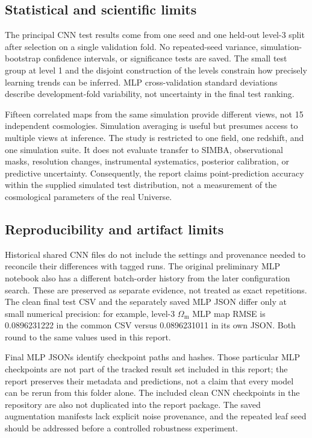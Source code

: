 \documentclass[11pt,a4paper]{article}
\newcommand{\Om}{\Omega_{\mathrm m}}
\begin{document}
\subsection{Statistical and scientific limits}
The principal CNN test results come from one seed and one held-out level-3 split after selection on a single validation fold. No repeated-seed variance, simulation-bootstrap confidence intervals, or significance tests are saved. The small test group at level 1 and the disjoint construction of the levels constrain how precisely learning trends can be inferred. MLP cross-validation standard deviations describe development-fold variability, not uncertainty in the final test ranking.

Fifteen correlated maps from the same simulation provide different views, not 15 independent cosmologies. Simulation averaging is useful but presumes access to multiple views at inference. The study is restricted to one field, one redshift, and one simulation suite. It does not evaluate transfer to SIMBA, observational masks, resolution changes, instrumental systematics, posterior calibration, or predictive uncertainty. Consequently, the report claims point-prediction accuracy within the supplied simulated test distribution, not a measurement of the cosmological parameters of the real Universe.

\subsection{Reproducibility and artifact limits}
Historical shared CNN files do not include the settings and provenance needed to reconcile their differences with tagged runs. The original preliminary MLP notebook also has a different batch-order history from the later configuration search. These are preserved as separate evidence, not treated as exact repetitions. The clean final test CSV and the separately saved MLP JSON differ only at small numerical precision: for example, level-3 $\Om$ MLP map RMSE is 0.0896231222 in the common CSV versus 0.0896231011 in its own JSON. Both round to the same values used in this report.

Final MLP JSONs identify checkpoint paths and hashes. Those particular MLP checkpoints are not part of the tracked result set included in this report; the report preserves their metadata and predictions, not a claim that every model can be rerun from this folder alone. The included clean CNN checkpoints in the repository are also not duplicated into the report package. The saved augmentation manifests lack explicit noise provenance, and the repeated leaf seed should be addressed before a controlled robustness experiment.
\end{document}

